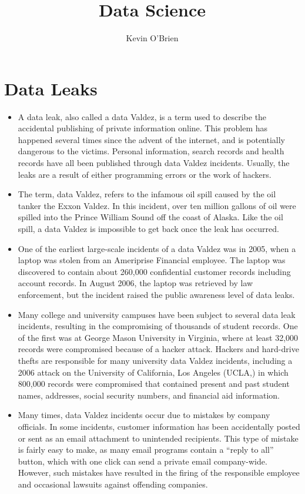 \documentclass[12pt]{article}
\title{Data Science}
\author{Kevin O'Brien}
\begin{document}
	\section*{Data Leaks}
	
	\begin{itemize}
\item A data leak, also called a data Valdez, is a term used to describe the accidental publishing of private information online. This problem has happened several times since the advent of the internet, and is potentially dangerous to the victims. Personal information, search records and health records have all been published through data Valdez incidents. Usually, the leaks are a result of either programming errors or the work of hackers.

 

\item The term, data Valdez, refers to the infamous oil spill caused by the oil tanker the Exxon Valdez. In this incident, over ten million gallons of oil were spilled into the Prince William Sound off the coast of Alaska. Like the oil spill, a data Valdez is impossible to get back once the leak has occurred.

 

\item One of the earliest large-scale incidents of a data Valdez was in 2005, when a laptop was stolen from an Ameriprise Financial employee. The laptop was discovered to contain about 260,000 confidential customer records including account records. In August 2006, the laptop was retrieved by law enforcement, but the incident raised the public awareness level of data leaks.

 

\item Many college and university campuses have been subject to several data leak incidents, resulting in the compromising of thousands of student records. One of the first was at George Mason University in Virginia, where at least 32,000 records were compromised because of a hacker attack. Hackers and hard-drive thefts are responsible for many university data Valdez incidents, including a 2006 attack on the University of California, Los Angeles (UCLA,) in which 800,000 records were compromised that contained present and past student names, addresses, social security numbers, and financial aid information.

 

\item Many times, data Valdez incidents occur due to mistakes by company officials. In some incidents, customer information has been accidentally posted or sent as an email attachment to unintended recipients. This type of mistake is fairly easy to make, as many email programs contain a “reply to all” button, which with one click can send a private email company-wide. However, such mistakes have resulted in the firing of the responsible employee and occasional lawsuits against offending companies.


\end{itemize}
\end{document}
